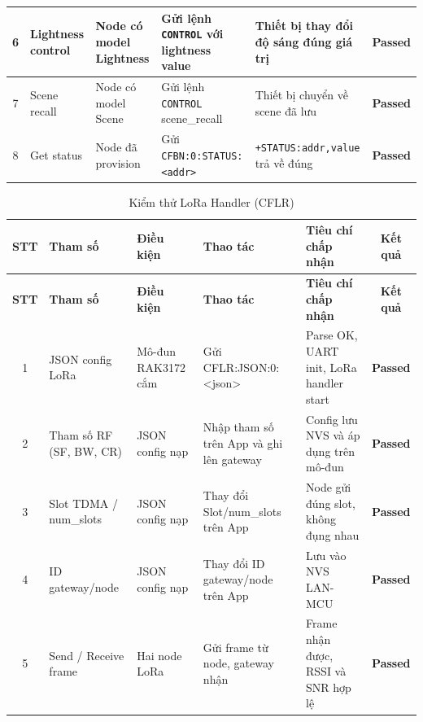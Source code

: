 \begin{longtable}{|c|p{}|p{}|p{}|p{}|c|}
            6 & Lightness control & Node có model Lightness & Gửi lệnh \texttt{CONTROL} với lightness value & Thiết bị thay đổi độ sáng đúng giá trị & \textcolor{modern_blue}{\textbf{Passed}} \\ \hline
        
            7 & Scene recall & Node có model Scene & Gửi lệnh \texttt{CONTROL} scene\_recall & Thiết bị chuyển về scene đã lưu & \textcolor{modern_blue}{\textbf{Passed}} \\ \hline
        
            8 & Get status & Node đã provision & Gửi \texttt{CFBN:0:}\newline\texttt{STATUS:<addr>} & \texttt{+STATUS:addr,}\newline\texttt{value} trả về đúng & \textcolor{modern_blue}{\textbf{Passed}} \\ \hline
        \end{longtable}

        \begin{longtable}{|c|p{}|p{}|p{}|p{}|c|}
            \caption{Kiểm thử LoRa Handler (CFLR)}
            \label{tab:test_lora_handler} \\
            \hline
            \textbf{STT} & \textbf{Tham số} & \textbf{Điều kiện} & \textbf{Thao tác} & \textbf{Tiêu chí chấp nhận} & \textbf{Kết quả} \\ \hline
            \endfirsthead
            \hline
            \textbf{STT} & \textbf{Tham số} & \textbf{Điều kiện} & \textbf{Thao tác} & \textbf{Tiêu chí chấp nhận} & \textbf{Kết quả} \\ \hline
            \endhead
            \hline
            \endfoot
            \endlastfoot
        
            1 & JSON config LoRa & Mô-đun RAK3172 cắm & Gửi CFLR:JSON:0:\newline<json> & Parse OK, UART init, LoRa handler start & \textcolor{modern_blue}{\textbf{Passed}} \\ \hline
            2 & Tham số RF (SF, BW, CR) & JSON config nạp & Nhập tham số trên App và ghi lên gateway & Config lưu NVS và áp dụng trên mô-đun & \textcolor{modern_blue}{\textbf{Passed}} \\ \hline
            3 & Slot TDMA / num\_slots & JSON config nạp & Thay đổi Slot/num\_slots trên App & Node gửi đúng slot, không đụng nhau & \textcolor{modern_blue}{\textbf{Passed}} \\ \hline
            4 & ID gateway/node & JSON config nạp & Thay đổi ID gateway/node trên App & Lưu vào NVS LAN-MCU & \textcolor{modern_blue}{\textbf{Passed}} \\ \hline
            5 & Send / Receive frame & Hai node LoRa & Gửi frame từ node, gateway nhận & Frame nhận được, RSSI và SNR hợp lệ & \textcolor{modern_blue}{\textbf{Passed}} \\ \hline
        \end{longtable}
        
